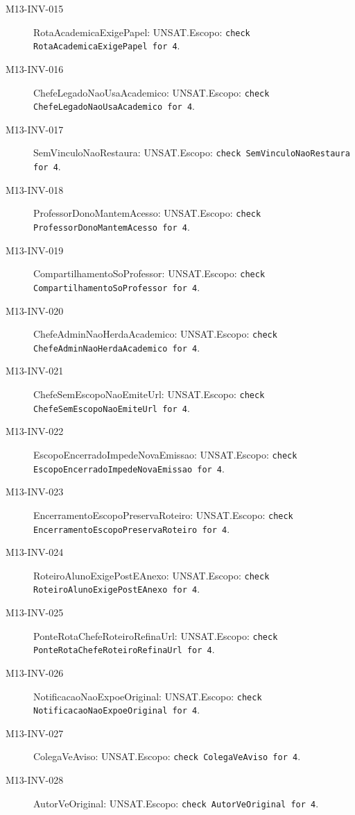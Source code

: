 \begin{description}
\item[M13-INV-015] RotaAcademicaExigePapel: UNSAT.\newline Escopo: \texttt{check RotaAcademicaExigePapel for 4}.
\item[M13-INV-016] ChefeLegadoNaoUsaAcademico: UNSAT.\newline Escopo: \texttt{check ChefeLegadoNaoUsaAcademico for 4}.
\item[M13-INV-017] SemVinculoNaoRestaura: UNSAT.\newline Escopo: \texttt{check SemVinculoNaoRestaura for 4}.
\item[M13-INV-018] ProfessorDonoMantemAcesso: UNSAT.\newline Escopo: \texttt{check ProfessorDonoMantemAcesso for 4}.
\item[M13-INV-019] CompartilhamentoSoProfessor: UNSAT.\newline Escopo: \texttt{check CompartilhamentoSoProfessor for 4}.
\item[M13-INV-020] ChefeAdminNaoHerdaAcademico: UNSAT.\newline Escopo: \texttt{check ChefeAdminNaoHerdaAcademico for 4}.
\item[M13-INV-021] ChefeSemEscopoNaoEmiteUrl: UNSAT.\newline Escopo: \texttt{check ChefeSemEscopoNaoEmiteUrl for 4}.
\item[M13-INV-022] EscopoEncerradoImpedeNovaEmissao: UNSAT.\newline Escopo: \texttt{check EscopoEncerradoImpedeNovaEmissao for 4}.
\item[M13-INV-023] EncerramentoEscopoPreservaRoteiro: UNSAT.\newline Escopo: \texttt{check EncerramentoEscopoPreservaRoteiro for 4}.
\item[M13-INV-024] RoteiroAlunoExigePostEAnexo: UNSAT.\newline Escopo: \texttt{check RoteiroAlunoExigePostEAnexo for 4}.
\item[M13-INV-025] PonteRotaChefeRoteiroRefinaUrl: UNSAT.\newline Escopo: \texttt{check PonteRotaChefeRoteiroRefinaUrl for 4}.
\item[M13-INV-026] NotificacaoNaoExpoeOriginal: UNSAT.\newline Escopo: \texttt{check NotificacaoNaoExpoeOriginal for 4}.
\item[M13-INV-027] ColegaVeAviso: UNSAT.\newline Escopo: \texttt{check ColegaVeAviso for 4}.
\item[M13-INV-028] AutorVeOriginal: UNSAT.\newline Escopo: \texttt{check AutorVeOriginal for 4}.

\end{description}
